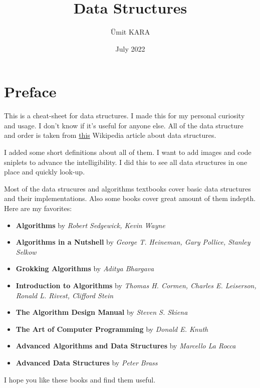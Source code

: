 \documentclass{book}
\title{Data Structures}
\author{Ümit KARA}
\date{July 2022}
\begin{document}
\begin{titlepage}
\maketitle
\end{titlepage}

\pagebreak
\phantom{a}
\thispagestyle{empty}
\pagebreak

\tableofcontents

\chapter*{Preface}

This is a cheat-sheet for data structures. I made this for my personal curiosity and usage. I don't know if it's useful for anyone else. All of the data structure and order is taken from \href{https://en.wikipedia.org/wiki/List_of_data_structures}{this} Wikipedia article about data structures.

I added some short definitions about all of them. I want to add images and code sniplets to advance the intelligibility. I did this to see all data structures in one place and quickly look-up.

Most of the data strucures and algorithms textbooks cover basic data structures and their implementations. Also some books cover great amount of them indepth. Here are my favorites:
\begin{itemize}
\item \textbf{Algorithms} by \textit{Robert Sedgewick, Kevin Wayne}
\item \textbf{Algorithms in a Nutshell} by \textit{George T. Heineman, Gary Pollice, Stanley Selkow}
\item \textbf{Grokking Algorithms} by \textit{Aditya Bhargava}
\item \textbf{Introduction to Algorithms} by \textit{Thomas H. Cormen, Charles E. Leiserson, Ronald L. Rivest, Clifford Stein}
\item \textbf{The Algorithm Design Manual} by \textit{Steven S. Skiena}
\item \textbf{The Art of Computer Programming} by \textit{Donald E. Knuth}
\item \textbf{Advanced Algorithms and Data Structures} by \textit{Marcello La Rocca}
\item \textbf{Advanced Data Structures} by \textit{Peter Brass}
\end{itemize}
I hope you like these books and find them useful.
\end{document}

